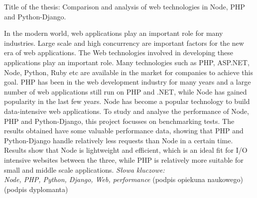 \newpage
\thispagestyle{empty}
\phantom{Nothing here}
\newpage
\clearpage
\phantom{Here neither}

\setcounter{page}{5}
\vspace{-1.5cm}
\begin{flushleft}
	Title of the thesis: Comparison and analysis of web technologies in Node, PHP and Python-Django.
\end{flushleft}
\vspace{0.5cm}
In the modern world, web applications play an important role for many industries. Large scale and high concurrency are important factors for the new era of web applications. The Web technologies involved in developing these applications play an important role. Many technologies such as PHP, ASP.NET, Node, Python, Ruby etc are available in the market for companies to achieve this goal. PHP has been in the web development industry for many years and a large number of web applications still run on PHP and .NET, while Node has gained popularity in the last few years. Node has become a popular technology to build data-intensive web applications. To study and analyse the performance of Node, PHP and Python-Django, this project focusses on benchmarking tests. The results obtained have some valuable performance data, showing that PHP and Python-Django handle relatively less requests than Node in a certain time. Results show that Node is lightweight and efficient, which is an ideal fit for I/O intensive websites between the three, while PHP is relatively more suitable for small and middle scale applications.
\vspace{0.5cm}
\noindent \textit{Słowa kluczowe: \\ Node, PHP, Python, Django, Web, performance} 
\vfill
(podpis opiekuna naukowego) \hfill (podpis dyplomanta)

\newpage
\thispagestyle{empty}
\phantom{Nothing here}
\newpage
\clearpage
\phantom{Here neither}

